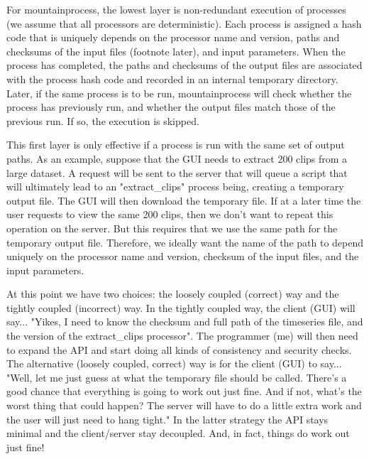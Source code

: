 \documentclass{article}
\begin{document}
For mountainprocess, the lowest layer is non-redundant execution of processes (we assume that all processors are deterministic). Each process is assigned a hash code that is uniquely depends on the processor name and version, paths and checksums of the input files (footnote later), and input parameters. When the process has completed, the paths and checksums of the output files are associated with the process hash code and recorded in an internal temporary directory. Later, if the same process is to be run, mountainprocess will check whether the process has previously run, and whether the output files match those of the previous run. If so, the execution is skipped.


This first layer is only effective if a process is run with the same set of output paths. As an example, suppose that the GUI needs to extract 200 clips from a large dataset. A request will be sent to the server that will queue a script that will ultimately lead to an "extract\_clips" process being, creating a temporary output file. The GUI will then download the temporary file. If at a later time the user requests to view the same 200 clips, then we don't want to repeat this operation on the server. But this requires that we use the same path for the temporary output file. Therefore, we ideally want the name of the path to depend uniquely on the processor name and version, checksum of the input files, and the input parameters.

At this point we have two choices: the loosely coupled (correct) way and the tightly coupled (incorrect) way. In the tightly coupled way, the client (GUI) will say... "Yikes, I need to know the checksum and full path of the timeseries file, and the version of the extract\_clips processor". The programmer (me) will then need to expand the API and start doing all kinds of consistency and security checks. The alternative (loosely coupled, correct) way is for the client (GUI) to say... "Well, let me just guess at what the temporary file should be called. There's a good chance that everything is going to work out just fine. And if not, what's the worst thing that could happen? The server will have to do a little extra work and the user will just need to hang tight." In the latter strategy the API stays minimal and the client/server stay decoupled. And, in fact, things do work out just fine!
\end{document}
